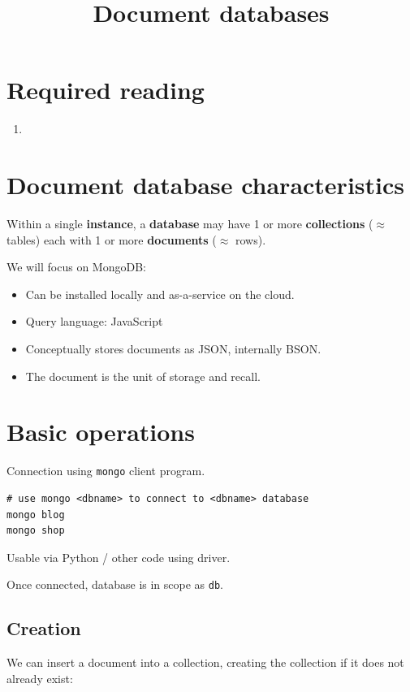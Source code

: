 \documentclass{pgnotes}
\title{Document databases}
\begin{document}
\maketitle

\section*{Required reading}

\begin{enumerate}
\item \citet[Chapter 3]{perkins:2018:seven}
\end{enumerate}

\section{Document database characteristics}

Within a single \textbf{instance}, a \textbf{database} may have 1 or more \textbf{collections} ($\approx$ tables) each with 1 or more \textbf{documents} ($\approx$ rows).


We will focus on MongoDB:
\begin{itemize}
\item Can be installed locally and as-a-service on the cloud.
\item Query language: JavaScript
\item Conceptually stores documents as JSON, internally BSON.
\item The document is the unit of storage and recall.
\end{itemize}


\section{Basic operations}

Connection using \texttt{mongo} client program.
\begin{verbatim}
# use mongo <dbname> to connect to <dbname> database
mongo blog 
mongo shop 
\end{verbatim}
Usable via Python / other code using driver.

Once connected, database is in scope as \texttt{db}.

\subsection{Creation}

We can insert a document into a collection, creating the collection if it does not already exist:
\end{document}
